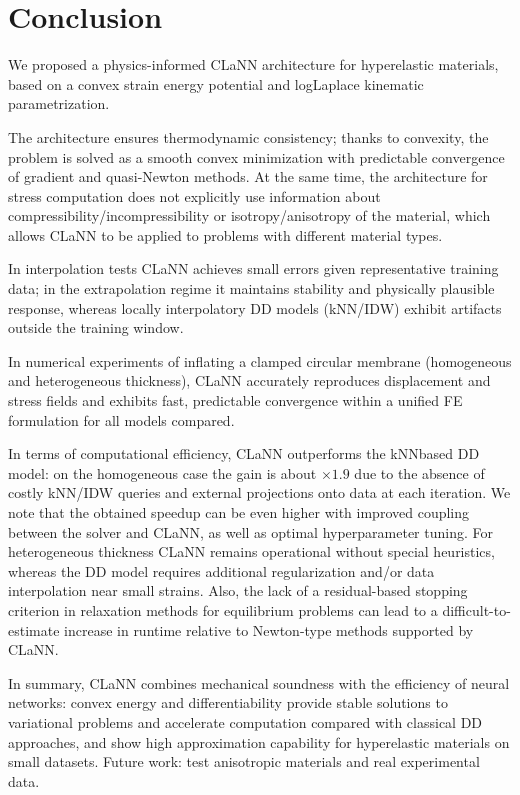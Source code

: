 \section{Conclusion}

We proposed a physics-informed CLaNN architecture for hyperelastic materials, based on a convex
strain energy potential and log\textendash Laplace kinematic parametrization.

The architecture ensures thermodynamic consistency; thanks to
convexity, the problem is solved as a smooth convex minimization with predictable convergence of gradient and
quasi-Newton methods.
At the same time, the architecture for stress computation does not explicitly use information about compressibility/incompressibility or isotropy/anisotropy
of the material, which allows CLaNN to be applied to problems with different material types.

In interpolation tests CLaNN achieves small errors given representative training data; in the extrapolation regime it maintains stability and physically plausible response,
whereas locally interpolatory DD models (k\textendash NN/IDW) exhibit artifacts outside the training window.

In numerical experiments of inflating a clamped circular membrane (homogeneous and heterogeneous thickness), CLaNN accurately
reproduces displacement and stress fields and exhibits fast, predictable convergence within a unified
FE formulation for all models compared.

In terms of computational efficiency, CLaNN outperforms the kNN\textendash based DD model: on the homogeneous case the gain is
about $\times 1.9$ due to the absence of costly k\textendash NN/IDW queries and external projections onto data at each iteration.
We note that the obtained speedup can be even higher with improved coupling between the solver and CLaNN, as well as optimal hyperparameter tuning.
For heterogeneous thickness CLaNN remains operational without special heuristics,
whereas the DD model requires additional regularization and/or data interpolation near small strains.
Also, the lack of a residual-based stopping criterion in relaxation methods for equilibrium problems can lead to a difficult-to-estimate increase in runtime
relative to Newton-type methods supported by CLaNN.

In summary, CLaNN combines mechanical soundness with the efficiency of neural networks: convex energy and differentiability provide stable 
solutions to variational problems and accelerate computation compared with classical DD approaches, and show high approximation capability for hyperelastic materials
on small datasets.
Future work: test anisotropic materials and real experimental data.



